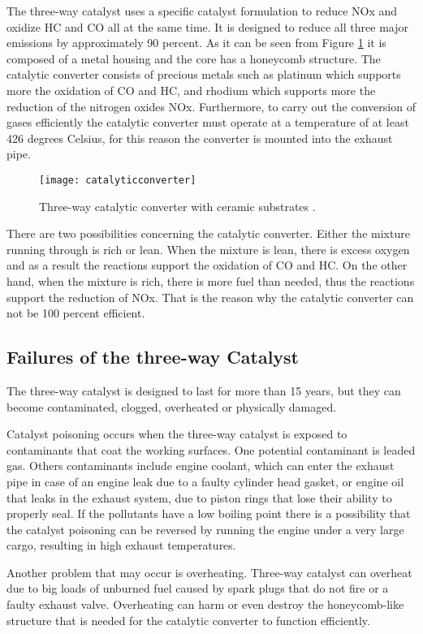 The three-way catalyst uses a specific catalyst formulation to reduce NOx and oxidize HC and CO all at the same time. It is designed to reduce all three major emissions by approximately 90 percent. As it can be seen from Figure \ref{fig:catalyticconverter} it is composed of a metal housing and the core has a honeycomb structure. The catalytic converter  consists of precious metals such as platinum which supports more the oxidation of CO and HC, and rhodium which supports more the reduction  of the nitrogen oxides NOx. Furthermore, to carry out the conversion of gases efficiently the catalytic converter must operate at a temperature of at least 426 degrees Celsius, for this reason the converter is mounted into the exhaust pipe. 
 
\begin{figure}[H]
    \centering
    \texttt{[image: catalyticconverter]}
    \caption{Three-way catalytic converter with ceramic substrates \cite{catalyticconverter}.}
    \label{fig:catalyticconverter}
\end{figure}


There are two possibilities concerning the catalytic converter. Either the mixture running through is rich or lean. When the mixture is lean, there is excess oxygen  and as a result the reactions support the oxidation of CO and HC. On the other hand, when the mixture is rich, there is more fuel than needed, thus the reactions support the reduction of NOx. That is the reason why the catalytic converter can not be 100 percent efficient.

\subsection{Failures of the three-way Catalyst}
The three-way catalyst is designed to last for more than 15 years, but they can become contaminated, clogged, overheated or physically damaged.
 
Catalyst poisoning occurs when the three-way catalyst is exposed to contaminants that coat the working surfaces. One potential contaminant is leaded gas. Others contaminants include engine coolant, which can enter the exhaust pipe in case of an engine leak due to a faulty cylinder head gasket, or engine oil that leaks in the exhaust system, due to piston rings that lose their ability to properly seal. If the pollutants have a low boiling point there is a possibility that the catalyst poisoning can be reversed by running the engine under a very large cargo, resulting in high exhaust temperatures. 

Another problem that may occur is overheating. Three-way catalyst can overheat due to big loads of unburned fuel caused by spark plugs that do not fire or a faulty exhaust valve. Overheating can harm or even destroy the honeycomb-like structure that is needed for the catalytic converter to function efficiently.
